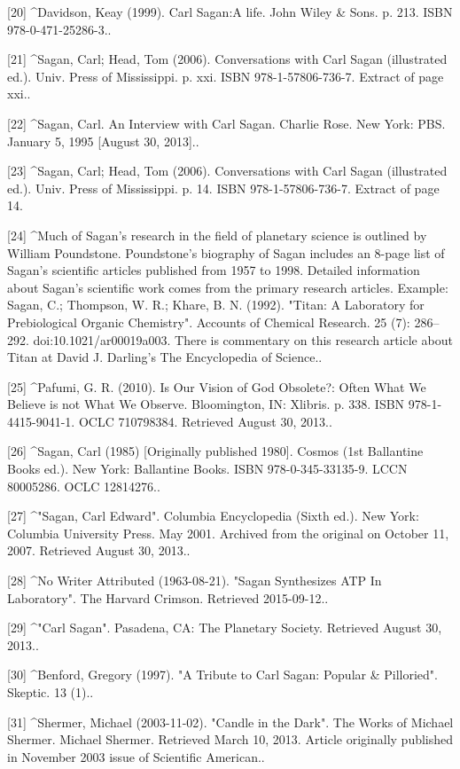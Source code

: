 [20]
^Davidson, Keay (1999). Carl Sagan:A life. John Wiley & Sons. p. 213. ISBN 978-0-471-25286-3..

[21]
^Sagan, Carl; Head, Tom (2006). Conversations with Carl Sagan (illustrated ed.). Univ. Press of Mississippi. p. xxi. ISBN 978-1-57806-736-7. Extract of page xxi..

[22]
^Sagan, Carl. An Interview with Carl Sagan. Charlie Rose. New York: PBS. January 5, 1995 [August 30, 2013]..

[23]
^Sagan, Carl; Head, Tom (2006). Conversations with Carl Sagan (illustrated ed.). Univ. Press of Mississippi. p. 14. ISBN 978-1-57806-736-7. Extract of page 14.

[24]
^Much of Sagan's research in the field of planetary science is outlined by William Poundstone. Poundstone's biography of Sagan includes an 8-page list of Sagan's scientific articles published from 1957 to 1998. Detailed information about Sagan's scientific work comes from the primary research articles. Example: Sagan, C.; Thompson, W. R.; Khare, B. N. (1992). "Titan: A Laboratory for Prebiological Organic Chemistry". Accounts of Chemical Research. 25 (7): 286–292. doi:10.1021/ar00019a003. There is commentary on this research article about Titan at David J. Darling's The Encyclopedia of Science..

[25]
^Pafumi, G. R. (2010). Is Our Vision of God Obsolete?: Often What We Believe is not What We Observe. Bloomington, IN: Xlibris. p. 338. ISBN 978-1-4415-9041-1. OCLC 710798384. Retrieved August 30, 2013..

[26]
^Sagan, Carl (1985) [Originally published 1980]. Cosmos (1st Ballantine Books ed.). New York: Ballantine Books. ISBN 978-0-345-33135-9. LCCN 80005286. OCLC 12814276..

[27]
^"Sagan, Carl Edward". Columbia Encyclopedia (Sixth ed.). New York: Columbia University Press. May 2001. Archived from the original on October 11, 2007. Retrieved August 30, 2013..

[28]
^No Writer Attributed (1963-08-21). "Sagan Synthesizes ATP In Laboratory". The Harvard Crimson. Retrieved 2015-09-12..

[29]
^"Carl Sagan". Pasadena, CA: The Planetary Society. Retrieved August 30, 2013..

[30]
^Benford, Gregory (1997). "A Tribute to Carl Sagan: Popular & Pilloried". Skeptic. 13 (1)..

[31]
^Shermer, Michael (2003-11-02). "Candle in the Dark". The Works of Michael Shermer. Michael Shermer. Retrieved March 10, 2013. Article originally published in November 2003 issue of Scientific American..

